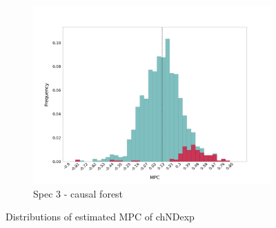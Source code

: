 \begin{figure}[t]
\begin{subfigure}{0.33\linewidth}
        \includegraphics[width=\linewidth]{figures/distributions/spec3_cf_chNDexp.png}
        \caption{Spec 3 - causal forest}
    \end{subfigure}\hfill
    \caption{Distributions of estimated MPC of chNDexp}
\end{figure}
